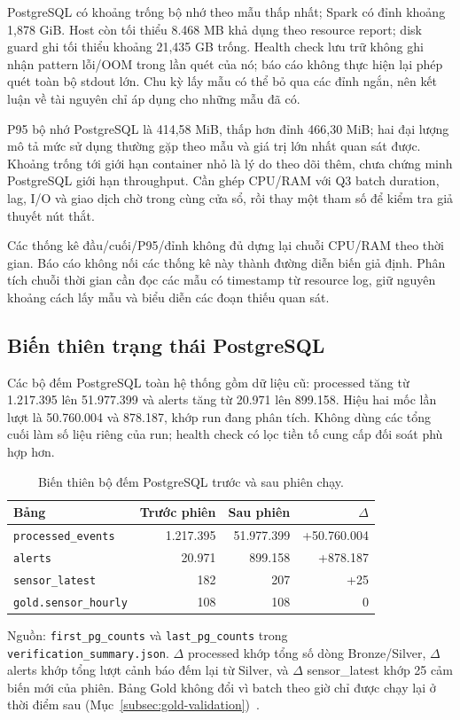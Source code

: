 PostgreSQL có khoảng trống bộ nhớ theo mẫu thấp nhất; Spark có đỉnh khoảng 1,878 GiB. Host còn tối thiểu 8.468 MB khả dụng theo resource report; disk guard ghi tối thiểu khoảng 21,435 GB trống. Health check lưu trữ không ghi nhận pattern lỗi/OOM trong lần quét của nó; báo cáo không thực hiện lại phép quét toàn bộ stdout lớn. Chu kỳ lấy mẫu có thể bỏ qua các đỉnh ngắn, nên kết luận về tài nguyên chỉ áp dụng cho những mẫu đã có.

P95 bộ nhớ PostgreSQL là 414,58 MiB, thấp hơn đỉnh 466,30 MiB; hai
đại lượng mô tả mức sử dụng thường gặp theo mẫu và giá trị lớn nhất quan
sát được. Khoảng trống tới giới hạn container nhỏ là lý do theo dõi thêm,
chưa chứng minh PostgreSQL giới hạn throughput. Cần ghép CPU/RAM với Q3
batch duration, lag, I/O và giao dịch chờ trong cùng cửa sổ, rồi thay một
tham số để kiểm tra giả thuyết nút thắt.

Các thống kê đầu/cuối/P95/đỉnh không đủ dựng lại chuỗi CPU/RAM theo thời
gian. Báo cáo không nối các thống kê này thành đường diễn biến giả định.
Phân tích chuỗi thời gian cần đọc các mẫu có timestamp từ resource log,
giữ nguyên khoảng cách lấy mẫu và biểu diễn các đoạn thiếu quan sát.

\subsection{Biến thiên trạng thái PostgreSQL}
Các bộ đếm PostgreSQL toàn hệ thống gồm dữ liệu cũ: processed tăng từ 1.217.395 lên 51.977.399 và alerts tăng từ 20.971 lên 899.158. Hiệu hai mốc lần lượt là 50.760.004 và 878.187, khớp run đang phân tích. Không dùng các tổng cuối làm số liệu riêng của run; health check có lọc tiền tố cung cấp đối soát phù hợp hơn.

\begin{table}[H]
\centering
\caption{Biến thiên bộ đếm PostgreSQL trước và sau phiên chạy.}
\label{tab:pg-delta}
\small
\begin{tabular}{l r r r}
\toprule
\textbf{Bảng} & \textbf{Trước phiên} & \textbf{Sau phiên} & \textbf{$\Delta$} \\
\midrule
\texttt{processed\_events} & 1.217.395 & 51.977.399 & +50.760.004 \\
\texttt{alerts} & 20.971 & 899.158 & +878.187 \\
\texttt{sensor\_latest} & 182 & 207 & +25 \\
\texttt{gold.sensor\_hourly} & 108 & 108 & 0 \\
\bottomrule
\end{tabular}
\end{table}
{\footnotesize\noindent Nguồn: \texttt{first\_pg\_counts} và \texttt{last\_pg\_counts} trong \texttt{verification\_summary.json}. $\Delta$ processed khớp tổng số dòng Bronze/Silver, $\Delta$ alerts khớp tổng lượt cảnh báo đếm lại từ Silver, và $\Delta$ sensor\_latest khớp 25 cảm biến mới của phiên. Bảng Gold không đổi vì batch theo giờ chỉ được chạy lại ở thời điểm sau (Mục~\ref{subsec:gold-validation})~\cite{bigdata_run_archive}.\par}

